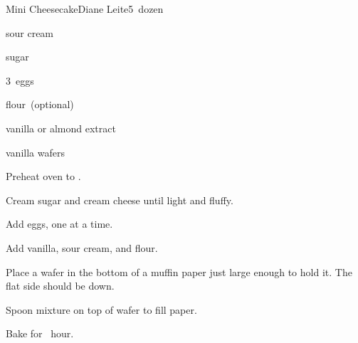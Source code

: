 \begin{recipe}{Mini Cheesecake}{Diane Leite}{5~dozen}

\begin{ingredients}
\item {} 
\item {} sour cream
\item {} sugar
\item 3~eggs
\item {} flour~(optional)
\item {} vanilla or almond extract
\item vanilla wafers
\end{ingredients}

\begin{directions}
\item Preheat oven to .
\item Cream sugar and cream cheese until light and fluffy.
\item Add eggs, one at a time.
\item Add vanilla, sour cream, and flour.
\item Place a wafer in the bottom of a muffin paper just large enough to hold it. The flat side should be down.
\item Spoon mixture on top of wafer to fill paper.
\item Bake for \half~hour.
\end{directions}

\end{recipe}
